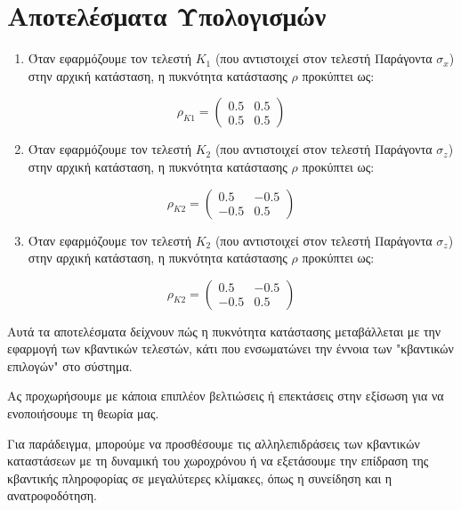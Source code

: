 \documentclass[a4paper,11pt]{article}
\begin{document}
\section*{Αποτελέσματα Υπολογισμών}

\begin{enumerate}
\item
  Όταν εφαρμόζουμε τον τελεστή \( K_1 \) (που αντιστοιχεί στον τελεστή
  Παράγοντα \( \sigma_x \)) στην αρχική κατάσταση, η πυκνότητα
  κατάστασης \( \rho \) προκύπτει ως:
\end{enumerate}

\[
\rho_{K1} = \begin{pmatrix}
0.5 & 0.5 \\
0.5 & 0.5
\end{pmatrix}
\]

\begin{enumerate}
\setcounter{enumi}{1} 
\item
  Όταν εφαρμόζουμε τον τελεστή \( K_2 \) (που αντιστοιχεί στον τελεστή
  Παράγοντα \( \sigma_z \)) στην αρχική κατάσταση, η πυκνότητα
  κατάστασης \( \rho \) προκύπτει ως:
\end{enumerate}

\[
\rho_{K2} = \begin{pmatrix}
 0.5 & -0.5 \\
 -0.5 & 0.5
\end{pmatrix}
\]

\begin{enumerate}
\setcounter{enumi}{2}
\item
  Όταν εφαρμόζουμε τον τελεστή \( K_2 \) (που αντιστοιχεί στον τελεστή
  Παράγοντα \( \sigma_z \)) στην αρχική κατάσταση, η πυκνότητα
  κατάστασης \( \rho \) προκύπτει ως:
\end{enumerate}

\[
\rho_{K2} = \begin{pmatrix}
0.5 & -0.5 \\
-0.5 & 0.5
\end{pmatrix}
\]

Αυτά τα αποτελέσματα δείχνουν πώς η πυκνότητα κατάστασης μεταβάλλεται με
την εφαρμογή των κβαντικών τελεστών, κάτι που ενσωματώνει την έννοια των
"κβαντικών επιλογών" στο σύστημα.

Ας προχωρήσουμε με κάποια επιπλέον βελτιώσεις ή επεκτάσεις στην
εξίσωση για να ενοποιήσουμε τη θεωρία μας.

Για παράδειγμα, μπορούμε να προσθέσουμε τις αλληλεπιδράσεις των
κβαντικών καταστάσεων με τη δυναμική του χωροχρόνου ή να εξετάσουμε την
επίδραση της κβαντικής πληροφορίας σε μεγαλύτερες κλίμακες, όπως η
συνείδηση και η ανατροφοδότηση.
\end{document}
